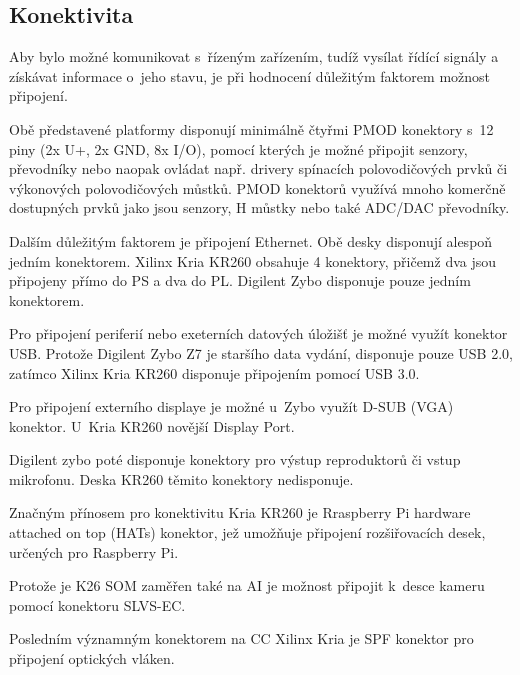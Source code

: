 \documentclass[a4paper, twoside, 11pt]{article}
\begin{document}
			\subsection{Konektivita}
					Aby bylo možné komunikovat s~řízeným zařízením, tudíž vysílat řídící signály a získávat informace o~jeho stavu, je při hodnocení důležitým faktorem možnost připojení.\par
					Obě představené platformy disponují minimálně čtyřmi PMOD konektory s~12 piny (2x U+, 2x GND, 8x I/O), pomocí kterých je možné připojit senzory, převodníky nebo naopak ovládat např. drivery spínacích polovodičových prvků či výkonových polovodičových můstků. PMOD konektorů využívá mnoho komerčně dostupných prvků jako jsou senzory, H můstky nebo také ADC/DAC převodníky.\par
					Dalším důležitým faktorem je připojení Ethernet. Obě desky disponují alespoň jedním konektorem. Xilinx Kria KR260 obsahuje 4 konektory, přičemž dva jsou připojeny přímo do PS a dva do PL. Digilent Zybo disponuje pouze jedním konektorem.\par
					Pro připojení periferií nebo exeterních datových úložišť je možné využít konektor USB. Protože Digilent Zybo Z7 je staršího data vydání, disponuje pouze USB 2.0, zatímco Xilinx Kria KR260 disponuje připojením pomocí USB 3.0.\par
					Pro připojení externího displaye je možné u~Zybo využít D-SUB (VGA) konektor. U~Kria KR260 novější Display Port.\par
					Digilent zybo poté disponuje konektory pro výstup reproduktorů či vstup mikrofonu. Deska KR260 těmito konektory nedisponuje.\par
					Značným přínosem pro konektivitu Kria KR260 je Rraspberry Pi hardware attached on top (HATs) konektor, jež umožňuje připojení rozšiřovacích desek, určených pro Raspberry Pi.\par
					Protože je K26 SOM zaměřen také na AI je možnost připojit k~desce kameru pomocí konektoru SLVS-EC.\par
					Posledním významným konektorem na CC Xilinx Kria je SPF konektor pro připojení optických vláken.
\end{document}
